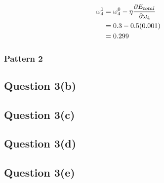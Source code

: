 \documentclass[10pt,a4paper]{article}
\begin{document}
\begin{equation}
\begin{split}
\omega_4^1 &= \omega_4^0 - \eta\pdv{E_{total}}{\omega_4}\\
           &= 0.3 -0.5(0.001)\\
           &= 0.299\\
\end{split}
\end{equation}

\subsubsection{Pattern 2}
\subsection{Question 3(b)}
\subsection{Question 3(c)}
\subsection{Question 3(d)}
\subsection{Question 3(e)}


\end{document}
